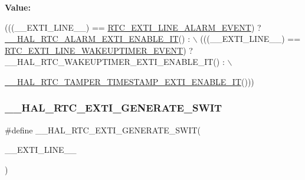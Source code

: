 {\bfseries Value\+:}
\begin{DoxyCode}
(((\_\_EXTI\_LINE\_\_)  == \hyperlink{group___r_t_c___private___constants_gaeffe9b89372b06df1c0eff2f4346682b}{RTC\_EXTI\_LINE\_ALARM\_EVENT}) ? 
      \hyperlink{group___r_t_c___exported___macros_ga47fd0b2d9a8679d49ae554d482231780}{\_\_HAL\_RTC\_ALARM\_EXTI\_ENABLE\_IT}() : \(\backslash\)
                                                  (((\_\_EXTI\_LINE\_\_) == 
      \hyperlink{group___r_t_c_ex___private___constants_ga1a1a58e244663850786c387bfa5474f2}{RTC\_EXTI\_LINE\_WAKEUPTIMER\_EVENT}) ? \_\_HAL\_RTC\_WAKEUPTIMER\_EXTI\_ENABLE\_IT() : 
      \(\backslash\)
                                                      
      \hyperlink{group___r_t_c_ex___tamper___timestamp_gab0d6016495814d67a8ec74f77631abb9}{\_\_HAL\_RTC\_TAMPER\_TIMESTAMP\_EXTI\_ENABLE\_IT}()))
\end{DoxyCode}
\mbox{\label{group___h_a_l___r_t_c___aliased___macros_ga757e6b82b6c280b6a924c0d8ac4bfef7}} 
\subsubsection{\texorpdfstring{\+\_\+\+\_\+\+H\+A\+L\+\_\+\+R\+T\+C\+\_\+\+E\+X\+T\+I\+\_\+\+G\+E\+N\+E\+R\+A\+T\+E\+\_\+\+S\+W\+IT}{\_\_HAL\_RTC\_EXTI\_GENERATE\_SWIT}}
{\footnotesize\ttfamily \#define \+\_\+\+\_\+\+H\+A\+L\+\_\+\+R\+T\+C\+\_\+\+E\+X\+T\+I\+\_\+\+G\+E\+N\+E\+R\+A\+T\+E\+\_\+\+S\+W\+IT(\begin{DoxyParamCaption}\item[{}]{\+\_\+\+\_\+\+E\+X\+T\+I\+\_\+\+L\+I\+N\+E\+\_\+\+\_\+ }\end{DoxyParamCaption})}

